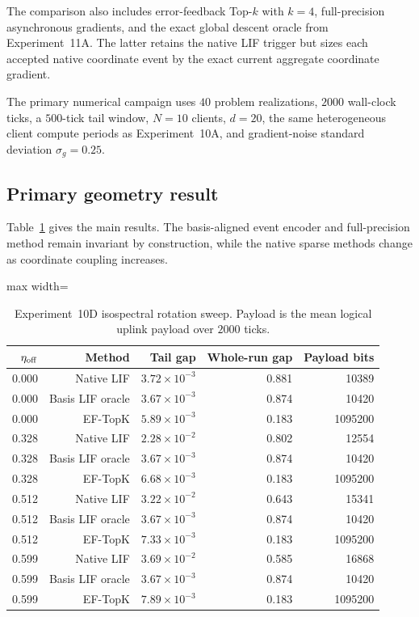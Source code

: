 The comparison also includes error-feedback Top-$k$ with $k=4$, full-precision asynchronous gradients, and the exact global descent oracle from Experiment~11A. The latter retains the native LIF trigger but sizes each accepted native coordinate event by the exact current aggregate coordinate gradient.

The primary numerical campaign uses $40$ problem realizations, $2000$ wall-clock ticks, a $500$-tick tail window, $N=10$ clients, $d=20$, the same heterogeneous client compute periods as Experiment~10A, and gradient-noise standard deviation $\sigma_g=0.25$.

\subsection{Primary geometry result}

Table~\ref{tab:exp10d-primary} gives the main results. The basis-aligned event encoder and full-precision method remain invariant by construction, while the native sparse methods change as coordinate coupling increases.

\begin{table}[ht]
  \centering
  \caption{Experiment~10D isospectral rotation sweep. Payload is the mean logical uplink payload over $2000$ ticks.}
  \label{tab:exp10d-primary}
  \begin{adjustbox}{max width=\textwidth}
\begin{tabular}{rrrrr}
    \toprule
    $\eta_{\rm off}$ & Method & Tail gap & Whole-run gap & Payload bits \\
    \midrule
    0.000 & Native LIF & $3.72\times10^{-3}$ & 0.881 & 10389 \\
    0.000 & Basis LIF oracle & $3.67\times10^{-3}$ & 0.874 & 10420 \\
    0.000 & EF-TopK & $5.89\times10^{-3}$ & 0.183 & 1095200 \\
    \midrule
    0.328 & Native LIF & $2.28\times10^{-2}$ & 0.802 & 12554 \\
    0.328 & Basis LIF oracle & $3.67\times10^{-3}$ & 0.874 & 10420 \\
    0.328 & EF-TopK & $6.68\times10^{-3}$ & 0.183 & 1095200 \\
    \midrule
    0.512 & Native LIF & $3.22\times10^{-2}$ & 0.643 & 15341 \\
    0.512 & Basis LIF oracle & $3.67\times10^{-3}$ & 0.874 & 10420 \\
    0.512 & EF-TopK & $7.33\times10^{-3}$ & 0.183 & 1095200 \\
    \midrule
    0.599 & Native LIF & $3.69\times10^{-2}$ & 0.585 & 16868 \\
    0.599 & Basis LIF oracle & $3.67\times10^{-3}$ & 0.874 & 10420 \\
    0.599 & EF-TopK & $7.89\times10^{-3}$ & 0.183 & 1095200 \\
    \bottomrule
  \end{tabular}
\end{adjustbox}
\end{table}

